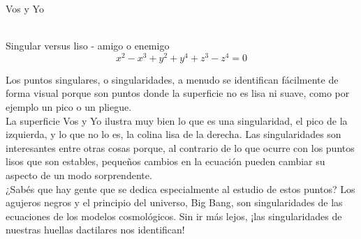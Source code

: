 \documentclass[es]{SurferDesc}%
\begin{document}
\footnotesize


\begin{surferPage}
  \begin{surferTitle}Vos y Yo\end{surferTitle}  \\
Singular versus liso - amigo o enemigo\\
\smallskip
\[x^2	- x^3+ y^2+ y^4+ z^3- z^4	=  0\]

\vspace{0.3cm}
Los puntos singulares, o singularidades, a menudo se identifican f\'acilmente de forma visual porque son puntos donde la superficie no es lisa ni suave, como por ejemplo un pico o un pliegue.\\
\vspace{0.3cm}
La superficie Vos y Yo ilustra muy bien lo que es una singularidad, el pico de la izquierda, y lo que no lo es, la colina lisa de la derecha. Las singularidades son interesantes entre otras cosas porque, al contrario de lo que ocurre con los puntos lisos que son estables, pequeños cambios en la ecuaci\'on pueden cambiar su aspecto de un modo sorprendente.\\
\vspace{0.3cm}
¿Sab\'es que hay gente que se dedica especialmente al estudio de estos puntos? Los agujeros negros y el principio del universo, Big Bang, son singularidades de las ecuaciones de los modelos cosmol\'ogicos. Sin ir m\'as lejos, ¡las singularidades de nuestras huellas dactilares nos identifican!

  \begin{surferText}
     \end{surferText}
\end{surferPage}
\end{document}
